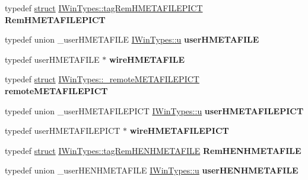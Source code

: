 \begin{DoxyCompactItemize}
typedef \hyperlink{interfacestruct}{struct} \hyperlink{struct_i_win_types_1_1tag_rem_h_m_e_t_a_f_i_l_e_p_i_c_t}{I\+Win\+Types\+::tag\+Rem\+H\+M\+E\+T\+A\+F\+I\+L\+E\+P\+I\+CT} {\bfseries Rem\+H\+M\+E\+T\+A\+F\+I\+L\+E\+P\+I\+CT}
\item 
\mbox{\label{interface_i_win_types_ad851ef3b96fe98a0aa3fd37176d1053d}} 
typedef union \+\_\+user\+H\+M\+E\+T\+A\+F\+I\+LE \hyperlink{union_i_win_types_1_1u}{I\+Win\+Types\+::u} {\bfseries user\+H\+M\+E\+T\+A\+F\+I\+LE}
\item 
\mbox{\label{interface_i_win_types_aeab2c04a04d864de81e825ab0e4d3a12}} 
typedef user\+H\+M\+E\+T\+A\+F\+I\+LE $\ast$ {\bfseries wire\+H\+M\+E\+T\+A\+F\+I\+LE}
\item 
\mbox{\label{interface_i_win_types_a412a0536732b5934034ce776dc00548d}} 
typedef \hyperlink{interfacestruct}{struct} \hyperlink{struct_i_win_types_1_1__remote_m_e_t_a_f_i_l_e_p_i_c_t}{I\+Win\+Types\+::\+\_\+remote\+M\+E\+T\+A\+F\+I\+L\+E\+P\+I\+CT} {\bfseries remote\+M\+E\+T\+A\+F\+I\+L\+E\+P\+I\+CT}
\item 
\mbox{\label{interface_i_win_types_aa8d1526902d45baf0c1a84b8b5be6236}} 
typedef union \+\_\+user\+H\+M\+E\+T\+A\+F\+I\+L\+E\+P\+I\+CT \hyperlink{union_i_win_types_1_1u}{I\+Win\+Types\+::u} {\bfseries user\+H\+M\+E\+T\+A\+F\+I\+L\+E\+P\+I\+CT}
\item 
\mbox{\label{interface_i_win_types_acd1e34f3324bc1d98b07d732e447a166}} 
typedef user\+H\+M\+E\+T\+A\+F\+I\+L\+E\+P\+I\+CT $\ast$ {\bfseries wire\+H\+M\+E\+T\+A\+F\+I\+L\+E\+P\+I\+CT}
\item 
\mbox{\label{interface_i_win_types_a61c2ed4507688def0fb93f654c817142}} 
typedef \hyperlink{interfacestruct}{struct} \hyperlink{struct_i_win_types_1_1tag_rem_h_e_n_h_m_e_t_a_f_i_l_e}{I\+Win\+Types\+::tag\+Rem\+H\+E\+N\+H\+M\+E\+T\+A\+F\+I\+LE} {\bfseries Rem\+H\+E\+N\+H\+M\+E\+T\+A\+F\+I\+LE}
\item 
\mbox{\label{interface_i_win_types_a7467f93d2a2665939ac5c49ac41f92ee}} 
typedef union \+\_\+user\+H\+E\+N\+H\+M\+E\+T\+A\+F\+I\+LE \hyperlink{union_i_win_types_1_1u}{I\+Win\+Types\+::u} {\bfseries user\+H\+E\+N\+H\+M\+E\+T\+A\+F\+I\+LE}

\end{DoxyCompactItemize}
